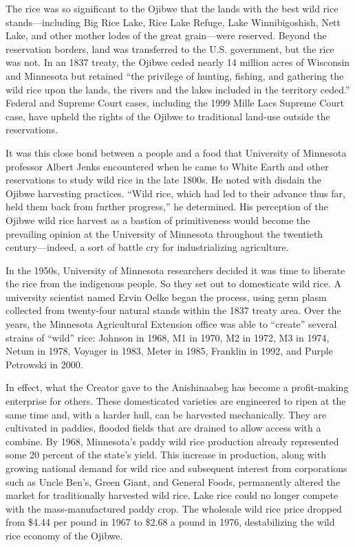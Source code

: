 The rice was so significant to the Ojibwe that the lands with the best
wild rice stands---including Big Rice Lake, Rice Lake Refuge, Lake
Winnibigoshish, Nett Lake, and other mother lodes of the great grain---were
reserved. Beyond the reservation borders, land was transferred to
the U.S. government, but the rice was not. In an 1837 treaty, the Ojibwe
ceded nearly 14 million acres of Wisconsin and Minnesota but retained
``the privilege of hunting, fishing, and gathering the wild rice upon
the lands, the rivers and the lakes included in the territory ceded.''
Federal and Supreme Court cases, including the 1999 Mille Lacs Supreme
Court case, have upheld the rights of the Ojibwe to traditional land-use
outside the reservations.

It was this close bond between a people and a food that University of
Minnesota professor Albert Jenks encountered when he came to White Earth
and other reservations to study wild rice in the late 1800s. He noted
with disdain the Ojibwe harvesting practices. ``Wild rice, which had led
to their advance thus far, held them back from further progress,'' he
determined. His perception of the Ojibwe wild rice harvest as a bastion
of primitiveness would become the prevailing opinion at the University
of Minnesota throughout the twentieth century---indeed, a sort of
battle cry for industrializing agriculture.

In the 1950s, University of Minnesota researchers decided it was time to
liberate the rice from the indigenous people. So they set out to
domesticate wild rice. A university scientist named Ervin Oelke began
the process, using germ plasm collected from twenty-four natural stands
within the 1837 treaty area. Over the years, the Minnesota Agricultural
Extension office was able to ``create'' several strains of ``wild''
rice: Johnson in 1968, M1 in 1970, M2 in 1972, M3 in 1974, Netum in
1978, Voyager in 1983, Meter in 1985, Franklin in 1992, and Purple
Petrowski in 2000.

In effect, what the Creator gave to the Anishinaabeg has become a
profit-making enterprise for others. These domesticated varieties are
engineered to ripen at the same time and, with a harder hull, can be
harvested mechanically. They are cultivated in paddies, flooded fields
that are drained to allow access with a combine. By 1968, Minnesota's
paddy wild rice production already represented some 20 percent of the
state's yield. This increase in production, along with growing national
demand for wild rice and subsequent interest from corporations such as
Uncle Ben's, Green Giant, and General Foods, permanently altered the
market for traditionally harvested wild rice. Lake rice could no longer
compete with the mass-manufactured paddy crop. The wholesale wild rice
price dropped from \$4.44 per pound in 1967 to \$2.68 a pound in 1976,
destabilizing the wild rice economy of the Ojibwe.

